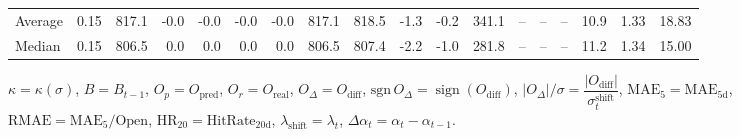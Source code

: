 \begin{threeparttable}
{\begin{tabular}{lrrrrrrrrrrrrrrrrr}
Average &     0.15 & 817.1 &              -0.0 &              -0.0 &               -0.0 &               -0.0 & 817.1 & 818.5 &       -1.3 &                     -0.2 &               341.1 &         -- &        -- &             -- &             10.9 &            1.33 &                  18.83 \\
 Median &     0.15 & 806.5 &               0.0 &               0.0 &                0.0 &                0.0 & 806.5 & 807.4 &       -2.2 &                     -1.0 &               281.8 &         -- &        -- &             -- &             11.2 &            1.34 &                  15.00 \\
\bottomrule
\end{tabular}
}
\begin{tablenotes}\footnotesize
\item $\kappa=\kappa(\sigma)$, $B=B_{t-1}$, $O_p=O_{\text{pred}}$, $O_r=O_{\text{real}}$, $O_\Delta=O_{\text{diff}}$, $\mathrm{sgn}\,O_\Delta=\operatorname{sign}(O_{\text{diff}})$, $|O_\Delta|/\sigma=\dfrac{|O_{\text{diff}}|}{\sigma_t^{\text{shift}}}$, $\mathrm{MAE}_5=\mathrm{MAE}_{5\text{d}}$, $\mathrm{RMAE}= \mathrm{MAE}_5 / \text{Open}$, $\mathrm{HR}_{20}=\mathrm{HitRate}_{20\text{d}}$, 
$\lambda_{\text{shift}}=\lambda_t$, 
$\Delta\alpha_t=\alpha_t-\alpha_{t-1}$.
\end{tablenotes}
\end{threeparttable}
\endgroup

